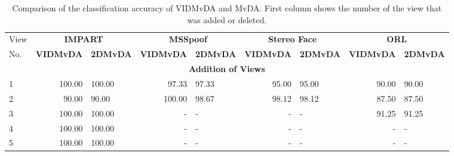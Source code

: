 \begin{table}[t]
	\centering
	\caption{Comparison of the classification accuracy of VIDMvDA and MvDA. First column shows the number of the view that was added or deleted.}
	\label{tab:VIDMvDA_Res_Acc_2D}
	\begin{tabular}{l r l r l r l r l} \hline
		View & \multicolumn{2}{c}{\textbf{IMPART}} & \multicolumn{2}{c}{\textbf{MSSpoof}} & \multicolumn{2}{c}{\textbf{Stereo Face}} & \multicolumn{2}{c}{\textbf{ORL}} \\
		No. & \textbf{\footnotesize{VIDMvDA}} & \textbf{\footnotesize{2DMvDA}} & \textbf{\footnotesize{VIDMvDA}} & \textbf{\footnotesize{2DMvDA}} & \textbf{\footnotesize{VIDMvDA}} & \textbf{\footnotesize{2DMvDA}} & \textbf{\footnotesize{VIDMvDA}} & \textbf{\footnotesize{2DMvDA}} \\ \hline
		\multicolumn{9}{c}{\textbf{Addition of Views}} \\ \hline
		1 & 100.00 \hspace{0.5cm} & 100.00 & 97.33 \hspace{0.5cm} & 97.33 & 95.00 \hspace{0.5cm} & 95.00 & 90.00 \hspace{0.5cm} & 90.00 \\ 
		2 & 90.00 \hspace{0.5cm} & 90.00 & 100.00 \hspace{0.5cm} & 98.67 & 98.12 \hspace{0.5cm} & 98.12 & 87.50 \hspace{0.5cm} & 87.50 \\ 
		3 & 100.00 \hspace{0.5cm} & 100.00 & - \hspace{0.5cm} & - & - \hspace{0.5cm} & - & 91.25 \hspace{0.5cm} & 91.25 \\ 
		4 & 100.00 \hspace{0.5cm} & 100.00 & - \hspace{0.5cm} & - & - \hspace{0.5cm} & - & - \hspace{0.5cm} & - \\ 
		5 & 100.00 \hspace{0.5cm} & 100.00 & - \hspace{0.5cm} & - & - \hspace{0.5cm} & - & - \hspace{0.5cm} & - \\ \hline


\end{tabular}
\end{table}

